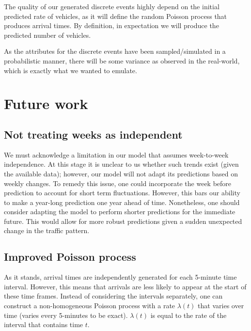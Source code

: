\documentclass[10pt,conference,compsocconf]{IEEEtran}
\begin{document}
The quality of our generated discrete events highly depend on the initial predicted rate of vehicles, as it will define the random Poisson process that produces arrival times. By definition, in expectation we will produce the predicted number of vehicles. 

As the attributes for the discrete events have been sampled/simulated in a probabilistic manner, there will be some variance as observed in the real-world, which is exactly what we wanted to emulate.


\section{Future work}

\subsection{Not treating weeks as independent}

We must acknowledge a limitation in our model that assumes week-to-week independence. At this stage it is unclear to us whether such trends exist (given the available data); however, our model will not adapt its predictions based on weekly changes. To remedy this issue, one could incorporate the week before prediction to account for short term fluctuations. However, this bars our ability to make a year-long prediction one year ahead of time. Nonetheless, one should consider adapting the model to perform shorter predictions for the immediate future. This would allow for more robust predictions given a sudden unexpected change in the traffic pattern.

\subsection{Improved Poisson process}

As it stands, arrival times are independently generated for each 5-minute time interval. However, this means that arrivals are less likely to appear at the start of these time frames. Instead of considering the intervals separately, one can construct a non-homogeneous Poisson process with a rate $\lambda(t)$ that varies over time (varies every 5-minutes to be exact). $\lambda(t)$ is equal to the rate of the interval that contains time $t$.
\end{document}
